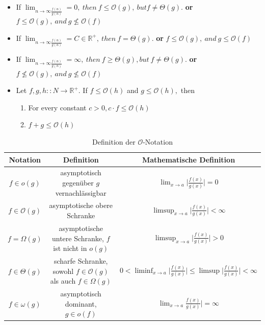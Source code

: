 \documentclass[a4paper]{article}
\begin{document}
    \begin{itemize}
        \item If $\lim_{n\to \infty \frac{f(n)}{g(n)}} = 0,\  then \ f\leq \mathcal{O}(g),\ but f \neq \Theta(g).$ \textbf{or} $ f\leq \mathcal{O}(g), \ and \ g \nleq \mathcal{O}(f)$
        \item If $\lim_{n\to \infty \frac{f(n)}{g(n)}} = C \in \mathbb{R}^+,\ then \ f = \Theta(g).$ 
            \textbf{or} $ f\leq \mathcal{O}(g), \ and \ g \leq \mathcal{O}(f)$
        \item If $\lim_{n\to \infty \frac{f(n)}{g(n)}} = \infty,\ then \ f \geq \Theta(g), but \ f \neq \Theta(g).$
        \textbf{or} $ f\nleq \mathcal{O}(g), \ and \ g \nleq \mathcal{O}(f)$

        \item Let $f,g,h :: N \to \mathbb{R}^+.$ If $f \leq \mathcal{O}(h)$ and $ g \leq \mathcal{O}(h),$ then
        \begin{enumerate}
            \item For every constant $c > 0, c \cdot f \leq \mathcal{O}(h)$
            \item $f + g \leq \mathcal{O}(h)$
        \end{enumerate}
    \end{itemize}

   


    \begin{table}[h]
        \centering
        \small
        \begin{tabular}{c|c|c}
            Notation & Definition & Mathematische Definition \\
            \hline
            $f \in o(g)$ 
            & asymptotisch gegenüber $g$ vernachlässigbar 
            & $\lim_{x\to a} \big| \frac{f(x)}{g(x)} \big| = 0 $\\
            
             $f \in \mathcal{O}(g)$
             & asymptotische obere Schranke  
             & $\limsup_{x\to a} \big| \frac{f(x)}{g(x)} \big| < \infty $ \\
             
            $f = \Omega(g)$ 
            & asymptotische untere Schranke, $f$ ist nicht in $o(g)$ 
            & 
            $\limsup_{x\to a} \big| \frac{f(x)}{g(x)} \big| > 0 $\\

            $f \in \Theta(g)$            
            & scharfe Schranke,  sowohl $f \in \mathcal{O}(g)$ als auch $f \in \Omega(g)$
            &  $0 < \liminf_{x\to a} \big| \frac{f(x)}{g(x)} \big| \leq \limsup \big| \frac{f(x)}{g(x)} \big| < \infty $ \\

            $f \in \omega(g)$
            &  asymptotisch dominant, $g \in o(f)$
            & $\lim_{x \to a}\frac{f(x)}{g(x)} \big| = \infty$ \\
        \hline
        \end{tabular}
        \caption{Definition der $\mathcal{O}$-Notation}
        \label{tab:ONotation}
    \end{table}
    
\end{document}
